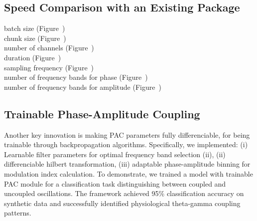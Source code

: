 \subsection{Speed Comparison with an Existing Package}
batch size (Figure~)\\
chunk size (Figure~)\\
number of channels (Figure~)\\
duration (Figure~)\\
sampling frequency (Figure~)\\
number of frequency bands for phase (Figure~)\\
number of frequency bands for amplitude (Figure~)\\

\subsection{Trainable Phase-Amplitude Coupling}
Another key innovation is making PAC parameters fully differenciable, for being trainable through backpropagation algorithms. Specifically, we implemented: (i) Learnable filter parameters for optimal frequency band selection (ii), (ii) differenciable hilbert transformation, (iii) adaptable phase-amplitude binning for modulation index calculation. To demonstrate, we trained a model with trainable PAC module for a classification task distinguishing between coupled and uncoupled oscillations. The framework achieved 95\% classification accuracy on synthetic data and successfully identified physiological theta-gamma coupling patterns.
